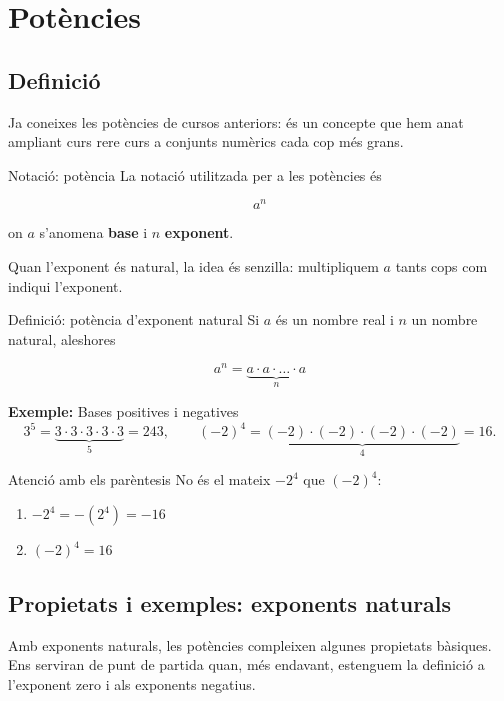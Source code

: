 \section{Potències}

\subsection{Definició}

Ja coneixes les potències de cursos anteriors: és un concepte que hem anat ampliant curs rere curs a conjunts numèrics cada cop més grans.

\begin{nota}{Notació: potència}
La notació utilitzada per a les potències és

\[
a^n
\]

on $a$ s'anomena \textbf{base} i $n$ \textbf{exponent}.
\end{nota}

Quan l'exponent és natural, la idea és senzilla: multipliquem $a$ tants cops com indiqui l'exponent.

\begin{definicio}{Definició: potència d'exponent natural}
Si $a$ és un nombre real i $n$ un nombre natural, aleshores

\[
a^n = \underbrace{a \cdot a \cdot \dots \cdot a}_n
\]
\end{definicio}

\begin{exemple}{\textbf{Exemple:} Bases positives i negatives}
\[
3^5 = \underbrace{3\cdot 3\cdot 3\cdot 3\cdot 3}_5 = 243,
\qquad
(-2)^4 = \underbrace{(-2)\cdot(-2)\cdot(-2)\cdot(-2)}_4 = 16.
\]
\end{exemple}

\begin{nota}{Atenció amb els parèntesis}
No és el mateix $-2^4$ que $(-2)^4$:

\begin{enumerate}
\item $-2^4=-(2^4)=-16$
\item $(-2)^4=16$
\end{enumerate}
\end{nota}

\subsection{Propietats i exemples: exponents naturals}

Amb exponents naturals, les potències compleixen algunes propietats bàsiques. Ens serviran de punt de partida quan, més endavant, estenguem la definició a l'exponent zero i als exponents negatius.

